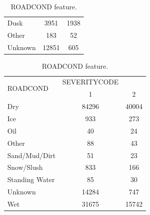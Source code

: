 \documentclass[12pt,a4paper,oneside]{article}
\begin{document}
\begin{table}[htbp!]
\begin{subtable}[h]{\textwidth}
\begin{tabular}{l c c}
            Dusk & 3951 & 1938 \\
            Other & 183 & 52 \\
            Unknown & 12851 & 605 \\
            \bottomrule
        \end{tabular}
    \end{subtable}
    \begin{subtable}[h]{\textwidth}
        \centering
        \caption{ROADCOND feature.}
        \label{tbl:roadcond}
        \begin{tabular}{l c c}
            \toprule
            \multirow{2}{*}{ROADCOND} & SEVERITYCODE \\
            \cmidrule{2-3}
            & 1 & 2 \\
            \midrule
            Dry & 84296 & 40004 \\
            Ice & 933 & 273 \\
            Oil & 40 & 24 \\
            Other & 88 & 43 \\
            Sand/Mud/Dirt & 51 & 23 \\
            Snow/Slush & 833 & 166 \\
            Standing Water & 85 & 30 \\
            Unknown & 14284 & 747 \\
            Wet & 31675 & 15742 \\
            \bottomrule
        \end{tabular}
    \end{subtable}
\end{table}
\end{document}
